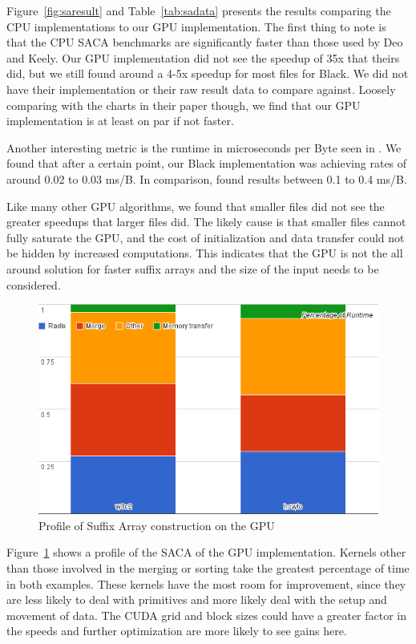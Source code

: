 Figure~\ref{fig:saresult} and Table~\ref{tab:sadata} presents the results comparing the CPU implementations to our GPU implementation.
The first thing to note is that the CPU SACA benchmarks are significantly faster than those used by Deo and Keely.
Our GPU implementation did not see the speedup of 35x that theirs did, but we still found around a 4-5x speedup for most files for Black.
We did not have their implementation or their raw result data to compare against.
Loosely comparing with the charts in their paper though, we find that our GPU implementation is at least on par if not faster.

Another interesting metric is the runtime in microseconds per Byte seen in \cite{al2012comparison}.
We found that after a certain point, our Black implementation was achieving rates of around 0.02 to 0.03 ms/B.
In comparison, \cite{al2012comparison} found results between 0.1 to 0.4 ms/B.

Like many other GPU algorithms, we found that smaller files did not see the greater speedups that larger files did.
The likely cause is that smaller files cannot fully saturate the GPU, and the cost of initialization and data transfer could not be hidden by increased computations.
This indicates that the GPU is not the all around solution for faster suffix arrays and the size of the input needs to be considered.

\begin{figure}[ht!]
\centering
\includegraphics[width=1.0\textwidth]{images/saprofile.png}
\caption{Profile of Suffix Array construction on the GPU}
\label{fig:saprofile}
\end{figure}

Figure~\ref{fig:saprofile} shows a profile of the SACA of the GPU implementation.
Kernels other than those involved in the merging or sorting take the greatest percentage of time in both examples.
These kernels have the most room for improvement, since they are less likely to deal with primitives and more likely deal with the setup and movement of data.
The CUDA grid and block sizes could have a greater factor in the speeds and further optimization are more likely to see gains here.

